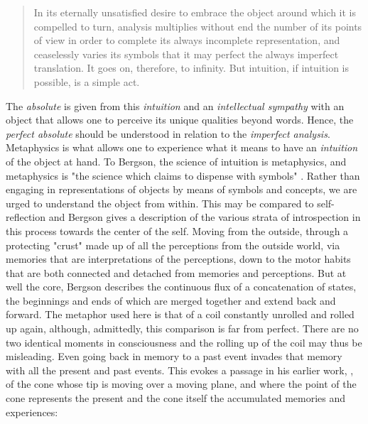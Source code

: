 \documentclass[11pt]{article}
\begin{document}
\begin{quote}
In its eternally unsatisfied desire to embrace the object around which it is compelled to turn, analysis multiplies without end the number of its points of view in order to complete its always incomplete representation, and ceaselessly varies its symbols that it may perfect the always imperfect translation. It goes on, therefore, to infinity. But intuition, if intuition is possible, is a simple act. \citep[p. 8]{Bergson1912}
\end{quote}

The \emph{absolute} is given from this \emph{intuition} and an \emph{intellectual sympathy} with an object that allows one to perceive its unique qualities beyond words. Hence, the \emph{perfect absolute} should be understood in relation to the \emph{imperfect analysis}. Metaphysics is what allows one to experience what it means to have an \emph{intuition} of the object at hand. To Bergson, the science of intuition is metaphysics, and metaphysics is "the science which claims to dispense with symbols" \citep[p. 9]{Bergson1912}. Rather than engaging in representations of objects by means of symbols and concepts, we are urged to understand the object from within. This may be compared to self-reflection and Bergson gives a description of the various strata of introspection in this process towards the center of the self. Moving from the outside, through a protecting "crust" made up of all the perceptions from the outside world, via memories that are interpretations of the perceptions, down to the motor habits that are both connected and detached from memories and perceptions. But at well the core, Bergson describes the continuous flux of a concatenation of states, the beginnings and ends of which are merged together and extend back and forward. The metaphor used here is that of a coil constantly unrolled and rolled up again, although, admittedly, this comparison is far from perfect. There are no two identical moments in consciousness and the rolling up of the coil may thus be misleading. Even going back in memory to a past event invades that memory with all the present and past events. This evokes a passage in his earlier work, , of the cone whose tip is moving over a moving plane, and where the point of the cone represents the present and the cone itself the accumulated memories and experiences: 
\end{document}
